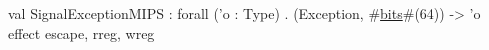 val SignalExceptionMIPS : forall ('o : Type) . (Exception, #\hyperref[zbits]{bits}#(64)) -> 'o effect {escape, rreg, wreg}
